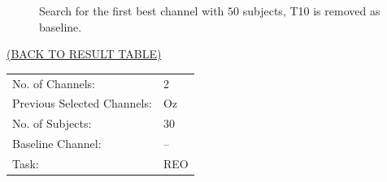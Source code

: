\documentclass[oneside, a4paper,10pt]{report}
\begin{document}
\begin{figure}[H]
  \caption{Search for the first best channel with $50$ subjects, T10 is removed as baseline.}
  \label{fg:1Ch_S50_B1}
\end{figure}


\newpage

\hspace*{12cm}\hyperlink{tab:TestResults}{(BACK TO RESULT TABLE)}

\bigskip
\bigskip

\begin{tabular}{ll}
  No. of Channels: & 2\\
  Previous Selected Channels: & Oz\\
  No. of Subjects: & 30\\
  Baseline Channel: & --\\
  Task:	& REO 
\end{tabular}
\end{document}
